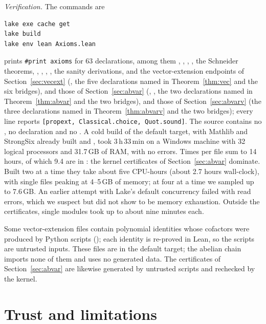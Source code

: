 \documentclass[11pt]{amsart}
\theoremstyle{definition}
\theoremstyle{remark}
\numberwithin{equation}{section}
\begin{document}
\emph{Verification.} The commands are
\begin{Verbatim}
lake exe cache get
lake build
lake env lean Axioms.lean
\end{Verbatim}
 prints \texttt{\#print\ axioms} for 63 declarations, among them
, , ,
, the Schneider theorems, , ,
, , the sanity derivations, and the vector-extension
endpoints of Section~\ref{sec:vecext} (, the five declarations named in Theorem~\ref{thm:vec}
and the six bridges), and those of Section~\ref{sec:abvar} (, ,
the two declarations named in Theorem~\ref{thm:abvar} and the two bridges), and those of Section~\ref{sec:abvarv}
(the three declarations named in Theorem~\ref{thm:abvarv} and the two bridges); every line reports \texttt{[propext,\ Classical.choice,\ Quot.sound]}. The source contains no , no
 declaration and no . A cold build of the default target, with Mathlib and StrongSix already built and , took
3\,h\,33\,min on a Windows machine with 32 logical processors and 31.7\,GB of RAM, with no errors. Times per file sum
to 14 hours, of which 9.4 are in : the kernel certificates of Section~\ref{sec:abvar} dominate. Built two
at a time they take about five CPU-hours (about 2.7 hours wall-clock), with single files peaking at 4--5\,GB of memory;
at four at a time we sampled up to 7.6\,GB. An earlier attempt with Lake's default concurrency failed with
 read errors, which we suspect but did not show to be memory exhaustion. Outside the
certificates, single modules took up to about nine minutes each.

Some vector-extension files contain polynomial identities whose cofactors were produced by Python
scripts (); each identity is re-proved in Lean, so the scripts are untrusted inputs. These
files are in the default target; the abelian chain imports none of them and uses no generated data. The
certificates of Section~\ref{sec:abvar} are likewise generated by untrusted scripts and rechecked by the kernel.

\section{Trust and limitations}\label{sec:trust}
\end{document}
